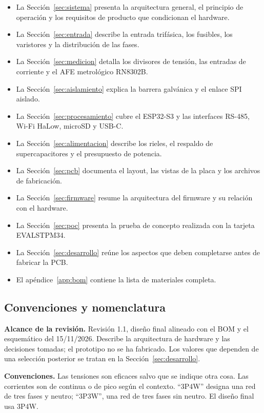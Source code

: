 \documentclass[11pt,a4paper]{article}
\begin{document}
\begin{itemize}
  \item La Sección~\ref{sec:sistema} presenta la arquitectura general, el
        principio de operación y los requisitos de producto que condicionan el
        hardware.
  \item La Sección~\ref{sec:entrada} describe la entrada trifásica, los
        fusibles, los varistores y la distribución de las fases.
  \item La Sección~\ref{sec:medicion} detalla los divisores de tensión, las
        entradas de corriente y el AFE metrológico RN8302B.
  \item La Sección~\ref{sec:aislamiento} explica la barrera galvánica y el
        enlace SPI aislado.
  \item La Sección~\ref{sec:procesamiento} cubre el ESP32-S3 y las interfaces
        RS-485, Wi-Fi HaLow, microSD y USB-C.
  \item La Sección~\ref{sec:alimentacion} describe los rieles, el respaldo de
        supercapacitores y el presupuesto de potencia.
  \item La Sección~\ref{sec:pcb} documenta el layout, las vistas de la placa y
        los archivos de fabricación.
  \item La Sección~\ref{sec:firmware} resume la arquitectura del firmware y su
        relación con el hardware.
  \item La Sección~\ref{sec:poc} presenta la prueba de concepto realizada con la
        tarjeta EVALSTPM34.
  \item La Sección~\ref{sec:desarrollo} reúne los aspectos que deben
        completarse antes de fabricar la PCB.
  \item El apéndice~\ref{app:bom} contiene la lista de materiales completa.
\end{itemize}

\subsection{Convenciones y nomenclatura}

\textbf{Alcance de la revisión.} Revisión 1.1, diseño final alineado con el BOM y el esquemático del 15/11/2026. Describe la
arquitectura de hardware y las decisiones tomadas; el prototipo no se ha
fabricado. Los valores que dependen de una selección posterior se tratan en la
Sección~\ref{sec:desarrollo}.

\textbf{Convenciones.} Las tensiones son eficaces salvo que se indique otra
cosa. Las corrientes son de continua o de pico según el contexto. ``3P4W''
designa una red de tres fases y neutro; ``3P3W'', una red de tres fases sin
neutro. El diseño final usa 3P4W.
\end{document}
